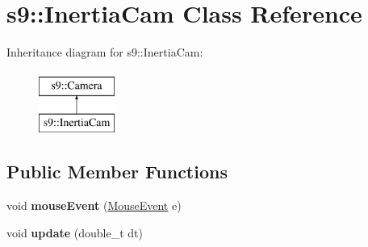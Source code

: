 \hypertarget{classs9_1_1InertiaCam}{\section{s9\-:\-:\-Inertia\-Cam \-Class \-Reference}
\label{classs9_1_1InertiaCam}
}
\-Inheritance diagram for s9\-:\-:\-Inertia\-Cam\-:\begin{figure}[H]
\begin{center}
\leavevmode
\includegraphics[height=2.000000cm]{classs9_1_1InertiaCam}
\end{center}
\end{figure}
\subsection*{\-Public \-Member \-Functions}
\begin{DoxyCompactItemize}
\item 
\hypertarget{classs9_1_1InertiaCam_a0a3aa66f0981d664e5eecca25bdfddc1}{void {\bfseries mouse\-Event} (\hyperlink{structs9_1_1MouseEvent}{\-Mouse\-Event} e)}\label{classs9_1_1InertiaCam_a0a3aa66f0981d664e5eecca25bdfddc1}

\item 
\hypertarget{classs9_1_1InertiaCam_abddce161fce68fba9b7a8b3bfe132a03}{void {\bfseries update} (double\-\_\-t dt)}\label{classs9_1_1InertiaCam_abddce161fce68fba9b7a8b3bfe132a03}

\end{DoxyCompactItemize}
